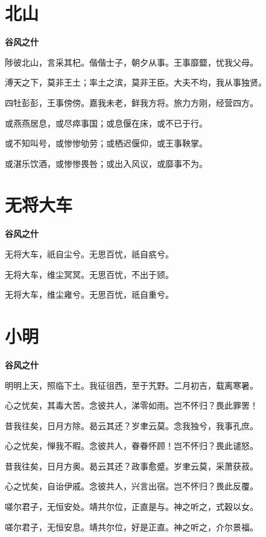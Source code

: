 \documentclass[12pt,a4paper]{ctexbook}
\begin{document}
\section{北山}
\textbf{谷风之什}\par\vspace{0.5em}
陟彼北山，言采其杞。偕偕士子，朝夕从事。王事靡盬，忧我父母。\par
溥天之下，莫非王土；率土之滨，莫非王臣。大夫不均，我从事独贤。\par
四牡彭彭，王事傍傍。嘉我未老，鲜我方将。旅力方刚，经营四方。\par
或燕燕居息，或尽瘁事国；或息偃在床，或不已于行。\par
或不知叫号，或惨惨劬劳；或栖迟偃仰，或王事鞅掌。\par
或湛乐饮酒，或惨惨畏咎；或出入风议，或靡事不为。\par

\section{无将大车}
\textbf{谷风之什}\par\vspace{0.5em}
无将大车，祇自尘兮。无思百忧，祇自疧兮。\par
无将大车，维尘冥冥。无思百忧，不出于颎。\par
无将大车，维尘雍兮。无思百忧，祇自重兮。\par

\section{小明}
\textbf{谷风之什}\par\vspace{0.5em}
明明上天，照临下土。我征徂西，至于艽野。二月初吉，载离寒暑。\par
心之忧矣，其毒大苦。念彼共人，涕零如雨。岂不怀归？畏此罪罟！\par
昔我往矣，日月方除。曷云其还？岁聿云莫。念我独兮，我事孔庶。\par
心之忧矣，惮我不暇。念彼共人，眷眷怀顾！岂不怀归？畏此谴怒。\par
昔我往矣，日月方奥。曷云其还？政事愈蹙。岁聿云莫，采萧获菽。\par
心之忧矣，自诒伊戚。念彼共人，兴言出宿。岂不怀归？畏此反覆。\par
嗟尔君子，无恒安处。靖共尔位，正直是与。神之听之，式穀以女。\par
嗟尔君子，无恒安息。靖共尔位，好是正直。神之听之，介尔景福。\par
\end{document}

